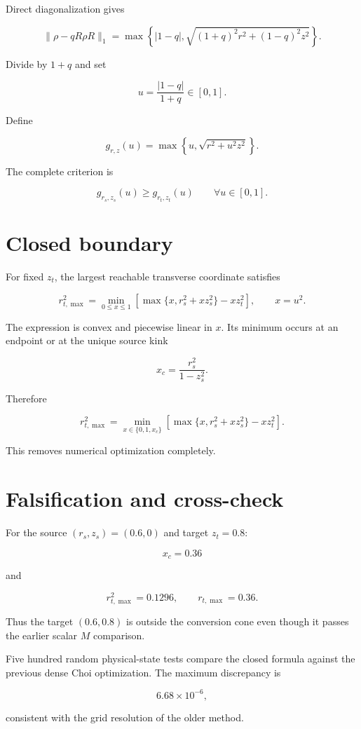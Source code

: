 \documentclass[11pt,a4paper,openany]{report}
\begin{document}
Direct diagonalization gives

\[
\|\rho-qR\rho R\|_1
=
\max\left\{
|1-q|,
\sqrt{(1+q)^2r^2+(1-q)^2z^2}
\right\}.
\]

Divide by \(1+q\) and set

\[
u=\frac{|1-q|}{1+q}\in[0,1].
\]

Define

\[
g_{r,z}(u)
=
\max\left\{
u,\sqrt{r^2+u^2z^2}
\right\}.
\]

The complete criterion is

\[
g_{r_s,z_s}(u)
\ge
g_{r_t,z_t}(u)
\qquad
\forall u\in[0,1].
\]

\section{Closed boundary}

For fixed \(z_t\), the largest reachable transverse coordinate satisfies

\[
r_{t,\max}^2
=
\min_{0\le x\le1}
\left[
\max\{x,r_s^2+xz_s^2\}
-xz_t^2
\right],
\qquad x=u^2.
\]

The expression is convex and piecewise linear in \(x\). Its minimum occurs at an endpoint or at the unique source kink

\[
x_c=\frac{r_s^2}{1-z_s^2}.
\]

Therefore

\[
r_{t,\max}^2
=
\min_{x\in\{0,1,x_c\}}
\left[
\max\{x,r_s^2+xz_s^2\}
-xz_t^2
\right].
\]

This removes numerical optimization completely.

\section{Falsification and cross-check}

For the source \((r_s,z_s)=(0.6,0)\) and target \(z_t=0.8\):

\[
x_c=0.36
\]

and

\[
r_{t,\max}^2
=
0.1296,
\qquad
r_{t,\max}=0.36.
\]

Thus the target \((0.6,0.8)\) is outside the conversion cone even though it passes the earlier scalar \(M\) comparison.

Five hundred random physical-state tests compare the closed formula against the previous dense Choi optimization. The maximum discrepancy is

\[
6.68\times10^{-6},
\]

consistent with the grid resolution of the older method.
\end{document}
